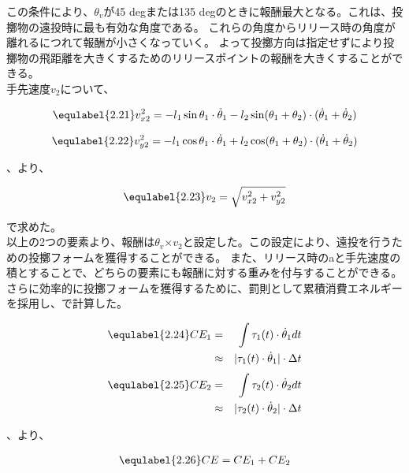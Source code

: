 この条件により、$\theta_{v}$が45 degまたは135 degのときに報酬最大となる。これは、投擲物の遠投時に最も有効な角度である。
これらの角度からリリース時の角度が離れるにつれて報酬が小さくなっていく。
よって投擲方向は指定せずにより投擲物の飛距離を大きくするためのリリースポイントの報酬を大きくすることができる。\\
手先速度$v_{2}$について、

\begin{eqnarray}
  \equlabel{2.21}
  v_{x2}^{2}=-l_{1}\sin\theta_{1}\cdot\dot{\theta}_{1}-l_2\sin(\theta_{1}+\theta_{2})\cdot(\dot{\theta}_{1}+\dot{\theta}_{2})
\end{eqnarray}

\begin{eqnarray}
  \equlabel{2.22}
  v_{y2}^{2}=-l_{1}\cos\theta_{1}\cdot\dot{\theta}_{1}+l_2\cos(\theta_{1}+\theta_{2})\cdot(\dot{\theta}_{1}+\dot{\theta}_{2})
\end{eqnarray}

、より、

\begin{eqnarray}
  \equlabel{2.23}
  v_{2}=\sqrt{v_{x2}^{2}+v_{y2}^{2}}
\end{eqnarray}

で求めた。\\

以上の2つの要素より、報酬は$\theta_{v}$$\times$$v_{2}$と設定した。この設定により、遠投を行うための投擲フォームを獲得することができる。
また、リリース時のaと手先速度の積とすることで、どちらの要素にも報酬に対する重みを付与することができる。\\
さらに効率的に投擲フォームを獲得するために、罰則として累積消費エネルギーを採用し、で計算した。

\begin{eqnarray}
  \equlabel{2.24}
  CE_{1}&=&\int \tau_{1}(t)\cdot\dot{\theta}_{1} dt\\
        &\approx&|\tau_{1}(t)\cdot\dot{\theta}_{1}|\cdot\Delta t

\end{eqnarray}
\begin{eqnarray}
  \equlabel{2.25}
  CE_{2}&=&\int \tau_{2}(t)\cdot\dot{\theta}_{2} dt\\
        &\approx&|\tau_{2}(t)\cdot\dot{\theta}_{2}|\cdot\Delta t
\end{eqnarray}

、より、

\begin{eqnarray}
  \equlabel{2.26}
  CE=CE_{1}+CE_{2}
\end{eqnarray}

